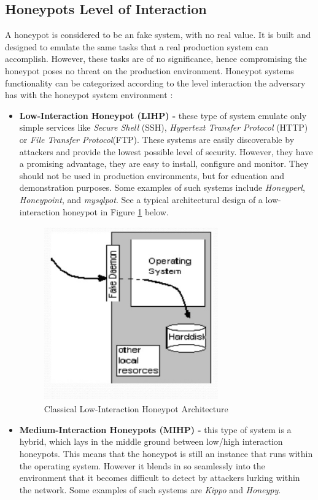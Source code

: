 \documentclass[grad,lot,lof,11pt,oneside,onehalfspace]{RUthesis}
\begin{document}
\subsection{Honeypots Level of Interaction}
A honeypot is considered to be an fake system, with no real value. It is built and designed to emulate the same tasks that a real production system can accomplish. However, these tasks are of no significance, hence compromising the honeypot poses no threat on the production environment. Honeypot systems functionality can be categorized according to the level interaction the adversary has with the honeypot system environment \cite{lihet_how_2015}:
\begin{itemize}
	\item\textbf{Low-Interaction Honeypot (LIHP) - }
	these type of system emulate only simple services like \textit{Secure Shell} (SSH), \textit{Hypertext Transfer Protocol} (HTTP) or \textit{File Transfer Protocol}(FTP). These systems are easily discoverable by attackers and provide the lowest possible level of security. However, they have a promising advantage, they are easy to install, configure and monitor. They should not be used in production environments, but for education and demonstration purposes. Some examples of such systems include \textit{Honeyperl}, \textit{Honeypoint}, and \textit{mysqlpot}. See a typical architectural design of a low-interaction honeypot in Figure \ref{fig:LowInterHP} below. 
\begin{figure}[h]
\centering
\includegraphics[width=7.5cm, height=7.5cm]{"Images/Chapter 2/LowInterHP"}
\caption{Classical Low-Interaction Honeypot Architecture}
\label{fig:LowInterHP}
\end{figure}
	\item\textbf{Medium-Interaction Honeypots (MIHP) -}
	this type of system is a hybrid, which lays in the middle ground between low/high interaction honeypots. This means that the honeypot is still an instance that runs within the operating system. However it blends in so seamlessly into the environment that it becomes difficult to detect by attackers lurking within the network. Some examples of such systems are \textit{Kippo} and \textit{Honeypy}.

\end{itemize}
\end{document}
